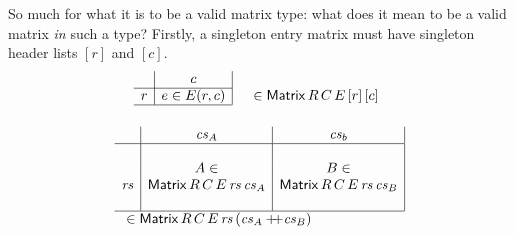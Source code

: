 \documentclass{IMEKO2024}
\newcommand{\append}{+\!\!\!+}
\newcommand{\Matrix}[5]{\mathsf{Matrix}\,#1\,#2\,#3\,#4\,#5}
\newcommand{\remph}{\emph}
\begin{document}
So much for what it is to be a valid matrix type: what does it mean to be a valid matrix \remph{in} such a type?
%
Firstly, a singleton entry matrix must have singleton header lists $[r]$ and $[c]$.
\[\begin{array}[b]{r|c|l}
\; & c \\
\cline{1-2}
r  & e\in E(r,c) & \quad \in \Matrix{R}{C}{E}{[r]}{[c]} \\
\cline{1-2}
\end{array} 
\]


\[\begin{array}{l}
\begin{array}{r|c|c|}
  & \cs_A & \cs_b \\
\hline
&&\\
&A \in & B \in \\
\rs &\Matrix{R}{C}{E}{\rs}{\cs_A} & \Matrix{R}{C}{E}{\rs}{\cs_B} \\
&&\\
\hline
\end{array}\\
\;\;\; \in \Matrix{R}{C}{E}{\rs}{(\cs_A\append\cs_B)}
\end{array}\]
\end{document}

